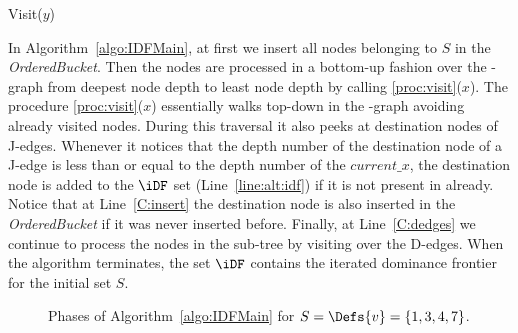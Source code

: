 {%
\begin{procedure}
  \caption{Visit($y$)}
  \label{proc:visit}
\end{procedure}

In Algorithm~\ref{algo:IDFMain}, at first we insert all nodes belonging to $S$ in the \textit{OrderedBucket}. 
Then the nodes are processed in a bottom-up fashion over the \DJ-graph from deepest node depth to least node depth by calling \ref{proc:visit}($x$). 
The procedure \ref{proc:visit}($x$) essentially walks top-down in the \DJ-graph avoiding already visited nodes. 
During this traversal it also peeks at destination nodes of J-edges. 
Whenever it notices that the depth number of the destination node of a J-edge is less than or equal to the depth number of the $\textit{current\_x}$, the destination node is added to the $\iDF$ set (Line~\ref{line:alt:idf}) if it is not present in \iDF already. 
Notice that at Line~\ref{C:insert} the destination node is also inserted in the {\it OrderedBucket} if it was never inserted before. 
Finally, at Line~\ref{C:dedges} we continue to process the nodes in the sub-tree by visiting over the D-edges. 
When the algorithm terminates, the set $\iDF$ contains the iterated dominance frontier for the initial set $S$.

\begin{figure}[htb]
    \centerline{}
    \caption{Phases of Algorithm~\ref{algo:IDFMain} for $S=\Defs{v}=\{1,3,4,7\}$.}
    \label{fig:sreedhargao}
\end{figure} 


}
